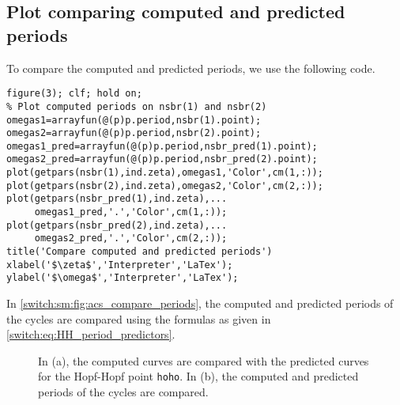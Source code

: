 \subsection{Plot comparing computed and predicted periods}
To compare the computed and predicted periods, we use the following code.
\begin{lstlisting}[style=customMatlab]
%% Compare computed and predicted periods
figure(3); clf; hold on;
% Plot computed periods on nsbr(1) and nsbr(2)
omegas1=arrayfun(@(p)p.period,nsbr(1).point);
omegas2=arrayfun(@(p)p.period,nsbr(2).point);
omegas1_pred=arrayfun(@(p)p.period,nsbr_pred(1).point);
omegas2_pred=arrayfun(@(p)p.period,nsbr_pred(2).point);
plot(getpars(nsbr(1),ind.zeta),omegas1,'Color',cm(1,:));
plot(getpars(nsbr(2),ind.zeta),omegas2,'Color',cm(2,:));
plot(getpars(nsbr_pred(1),ind.zeta),...
     omegas1_pred,'.','Color',cm(1,:));
plot(getpars(nsbr_pred(2),ind.zeta),...
     omegas2_pred,'.','Color',cm(2,:));
title('Compare computed and predicted periods')
xlabel('$\zeta$','Interpreter','LaTex');
ylabel('$\omega$','Interpreter','LaTex');
\end{lstlisting}
In \cref{switch:sm:fig:acs_compare_periods}, the computed and predicted periods of the cycles are compared using the formulas as given in \cref{switch:eq:HH_period_predictors}.

\begin{figure}
\centering
{} \hfill
{}
\caption{In \textup{(a)}, the computed curves are compared with the predicted curves for the Hopf-Hopf point \lstinline|hoho|. In \textup{(b)}, the computed and predicted periods of the cycles are compared.}
\end{figure}


